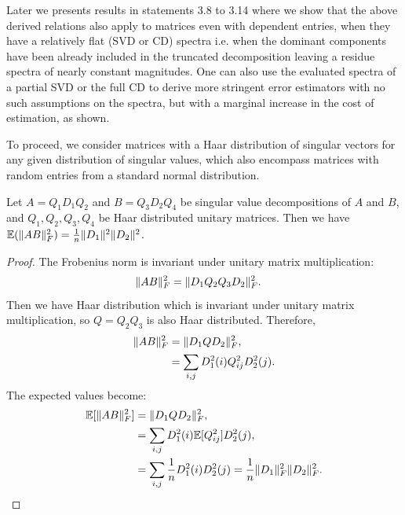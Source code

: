\documentclass[onefignum,onetabnum]{siamart171218}
\DeclarePairedDelimiter\norm{\lVert}{\rVert}
\begin{document}
Later we presents results in statements 3.8 to 3.14 where we show that the above derived relations also apply to matrices even with dependent entries, when they have a relatively flat (SVD or CD) spectra i.e. when the dominant components have been already included in the truncated decomposition leaving a residue spectra of nearly constant magnitudes. One can also use the evaluated spectra of a partial SVD or the full CD to derive more stringent error estimators with no such assumptions on the spectra, but with a marginal increase in the cost of estimation, as shown.

To proceed, we consider matrices with a Haar distribution of singular vectors for any given distribution of singular values, which also encompass matrices with random entries from a standard normal distribution.

\begin{lemma}\label{th:expected_norm_square}
    Let $A = Q_1 D_1 Q_2$ and $B = Q_3 D_2 Q_4$ be singular value decompositions of $A$ and $B$, and $Q_1,Q_2,Q_3,Q_4$ be Haar distributed unitary matrices. Then we have $\mathbb{E}(\norm{AB}^2_F) = \frac{1}{n}\norm{D_1}^2 \norm{D_2}^2$. 
\end{lemma}
\begin{proof}
    The Frobenius norm is invariant under unitary matrix multiplication:
    \begin{align*}
        \norm{AB}^2_F &=  \norm{D_1 Q_2Q_3 D_2}^2_F.
    \end{align*}
    Then we have Haar distribution which is invariant under unitary matrix multiplication, so $Q = Q_2Q_3$ is also Haar distributed. Therefore, 
     \begin{align*}
        \norm{AB}^2_F &=  \norm{D_1 Q D_2}^2_F, \\
        &= \sum_{i,j} D^2_1(i) Q^2_{ij} D^2_2(j).
    \end{align*}
    The expected values become:
    \begin{align*}
        \mathbb{E}[\norm{AB}^2_F] &=  \norm{D_1 Q D_2}^2_F, \\
        &= \sum_{i,j} D^2_1(i)\mathbb{E}[ Q^2_{ij}] D^2_2(j), \\
        &= \sum_{i,j} \frac{1}{n}D^2_1(i) D^2_2(j) = \frac{1}{n} \norm{D_1}_F^2 \norm{D_2}_F^2.
    \end{align*}
\end{proof}
\end{document}
